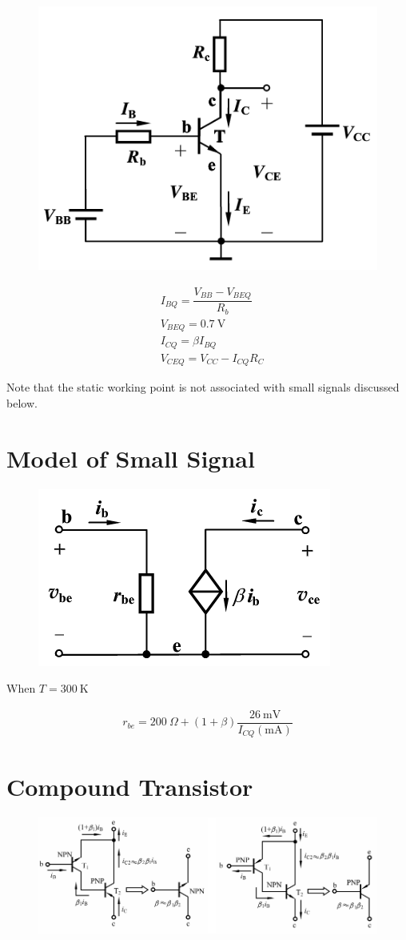 \begin{figure}[H]
  \centering
  \includegraphics[width=0.4\linewidth]{figures/BJT-static}
  \label{fig:}
\end{figure}

\begin{equation*}
  \begin{aligned}
    & I_{BQ} = \dfrac{V_{BB} - V_{BEQ}}{R_b} \\
    & V_{BEQ} = 0.7 \  \mathrm{V} \\
    & I_{CQ} = \beta I_{BQ} \\
    & V_{CEQ} = V_{CC} - I_{CQ} R_{C}
  \end{aligned}
\end{equation*}

Note that the static working point is not associated with small signals discussed below.

\section{Model of Small Signal}

\begin{figure}[H]
  \centering
  \includegraphics[width=0.4\linewidth]{figures/BJT-small-signal}
  \label{fig:}
\end{figure}

When $T = 300 \  \mathrm{K}$

\begin{equation*}
  \begin{aligned}
    r_{be} = 200 \  \Omega + \left( 1 + \beta \right) \dfrac{26 \  \mathrm{mV}}{I_{CQ} \left( \mathrm{mA} \right)} 
  \end{aligned}
\end{equation*}

\section{Compound Transistor}

\begin{figure}[H]
  \centering
  \includegraphics[width=0.7\linewidth]{figures/BJT-compound}
  \label{fig:}
\end{figure}




